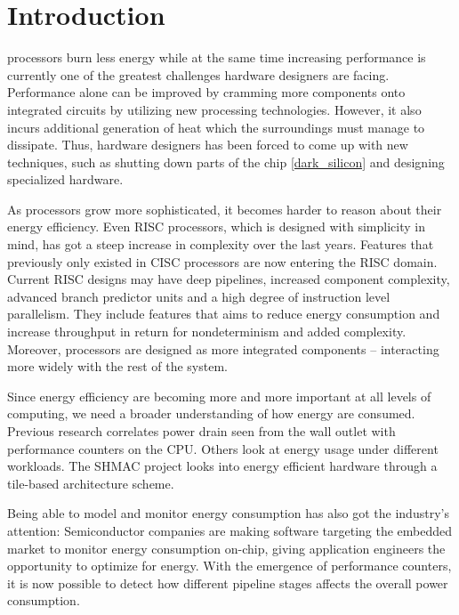 \section{Introduction}

 processors burn less energy while at the same time
increasing performance is currently one of the greatest challenges hardware
designers are facing. Performance alone can be improved by cramming more
components onto integrated circuits \cite{moore1965cramming} by utilizing new
processing technologies. However, it also incurs additional generation of heat
which the surroundings must manage to dissipate. Thus, hardware designers has
been forced to come up with new techniques, such as shutting down parts of the
chip \ref{dark_silicon} and designing specialized hardware.

As processors grow more sophisticated, it becomes harder to reason about their
energy efficiency. Even RISC processors, which is designed with simplicity in
mind\cite{sivarama}, has got a steep increase in complexity over the last
years\cite{alf_egil_bogen_cisc_risc_blog}. Features that previously only existed
in CISC processors are now entering the RISC domain. Current RISC designs may
have deep pipelines, increased component complexity, advanced branch predictor
units and a high degree of instruction level parallelism. They include features
that aims to reduce energy consumption and increase throughput in return for
nondeterminism and added complexity. Moreover, processors are designed as more
integrated components -- interacting more widely with the rest of the system.

Since energy efficiency are becoming more and more important at all levels of
computing, we need a broader understanding of how energy are consumed. Previous
research correlates power drain seen from the wall outlet with performance
counters on the CPU\cite{singh}\cite{bertran}\cite{bircher}. Others look at
energy usage under different workloads\cite{carrol2010analysis}. The SHMAC
project\cite{shmac} looks into energy efficient hardware through a tile-based
architecture scheme.

Being able to model and monitor energy consumption has also
got the industry's attention: Semiconductor companies are making software
targeting the embedded market to monitor energy consumption on-chip, giving
application engineers the opportunity to optimize for energy. With the emergence
of performance counters, it is now possible to detect how different pipeline
stages affects the overall power consumption\cite{bertran}.

